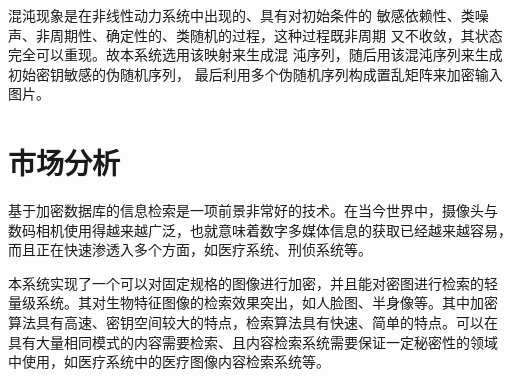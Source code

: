 混沌现象是在非线性动力系统中出现的、具有对初始条件的
敏感依赖性、类噪声、非周期性、确定性的、类随机的过程，这种过程既非周期
又不收敛，其状态完全可以重现\cite{lu2007}。故本系统选用该映射来生成混
沌序列，随后用该混沌序列来生成初始密钥敏感的伪随机序列，
最后利用多个伪随机序列构成置乱矩阵来加密输入图片。

\section{市场分析}
\label{sec:market-analysis}

基于加密数据库的信息检索是一项前景非常好的技术。在当今世界中，摄像头与
数码相机使用得越来越广泛，也就意味着数字多媒体信息的获取已经越来越容易，
而且正在快速渗透入多个方面，如医疗系统、刑侦系统等。

本系统实现了一个可以对固定规格的图像进行加密，并且能对密图进行检索的轻
量级系统。其对生物特征图像的检索效果突出，如人脸图、半身像等。其中加密
算法具有高速、密钥空间较大的特点，检索算法具有快速、简单的特点。可以在
具有大量相同模式的内容需要检索、且内容检索系统需要保证一定秘密性的领域
中使用，如医疗系统中的医疗图像内容检索系统等。

